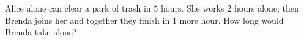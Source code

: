 Alice alone can clear a park of trash in $5$ hours. She works $2$ hours alone; then Brenda joins her and together they finish in $1$ more hour. How long would Brenda take alone?
